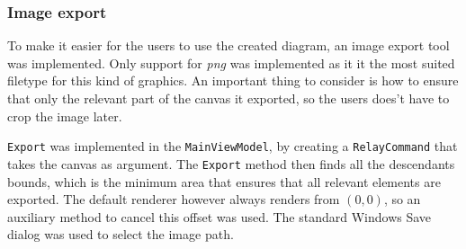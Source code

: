 \subsubsection{Image export}

To make it easier for the users to use the created diagram, an image export tool
was implemented. Only support for \textit{png} was implemented as it it
the most suited filetype for this kind of graphics. An important thing to consider
is how to ensure that only the relevant part of the canvas it exported, so
the users does't have to crop the image later.

\texttt{Export} was implemented in the \texttt{MainViewModel}, by creating a
\texttt{RelayCommand} that takes the canvas as argument.
The \texttt{Export} method then finds all the  descendants bounds, which is 
the minimum area that ensures that all relevant elements are exported. The
default renderer however always renders from $(0,0)$, so an auxiliary method to
cancel this offset was used. The standard Windows Save dialog was used to
select the image path.

